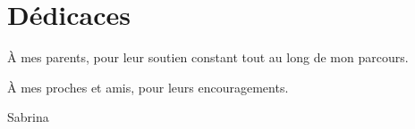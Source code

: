 \chapter*{D\'edicaces}

\`A mes parents, pour leur soutien constant tout au long de mon parcours.

\`A mes proches et amis, pour leurs encouragements.

\vspace{2cm}
\begin{flushright}
Sabrina
\end{flushright}

\clearpage
